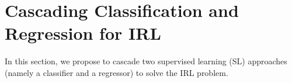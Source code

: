 \documentclass{article} %
\newcommand{\0}{\mathbf{0}}
\newcommand{\1}{\mathbf{1}}
\begin{document}
\section{Cascading Classification and Regression for IRL}
\label{section: Cascading}
In this section, we propose to cascade two supervised learning (SL) approaches (namely a classifier and a regressor) to solve the IRL problem.
\end{document}
